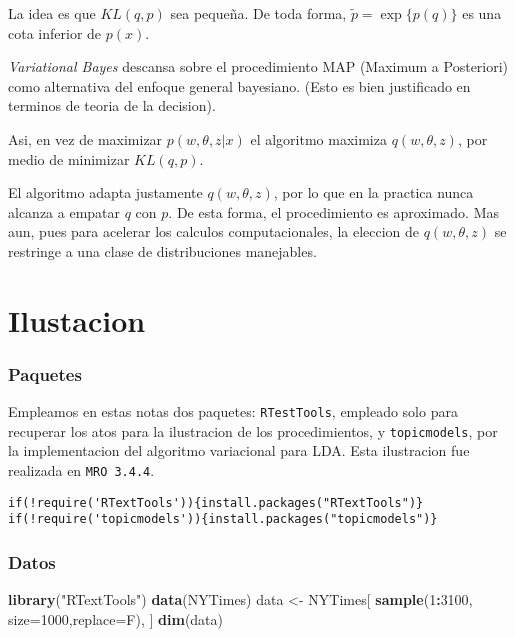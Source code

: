 \documentclass[11pt,]{article}
\newenvironment{Shaded}{\begin{snugshade}}{\end{snugshade}}
\newcommand{\KeywordTok}[1]{\textcolor[rgb]{0.13,0.29,0.53}{\textbf{#1}}}
\newcommand{\DataTypeTok}[1]{\textcolor[rgb]{0.13,0.29,0.53}{#1}}
\newcommand{\DecValTok}[1]{\textcolor[rgb]{0.00,0.00,0.81}{#1}}
\newcommand{\StringTok}[1]{\textcolor[rgb]{0.31,0.60,0.02}{#1}}
\newcommand{\OperatorTok}[1]{\textcolor[rgb]{0.81,0.36,0.00}{\textbf{#1}}}
\newcommand{\NormalTok}[1]{#1}
\begin{document}
La idea es que \(KL(q,p)\) sea pequeña. De toda forma,
\(\tilde{p}=\exp\{p(q)\}\) es una cota inferior de \(p(x)\).

\emph{Variational Bayes} descansa sobre el procedimiento MAP (Maximum a
Posteriori) como alternativa del enfoque general bayesiano. (Esto es
bien justificado en terminos de teoria de la decision).

Asi, en vez de maximizar \(p(w,\theta,z|x)\) el algoritmo maximiza
\(q(w,\theta,z)\), por medio de minimizar \(KL(q,p)\).

El algoritmo adapta justamente \(q(w,\theta,z)\), por lo que en la
practica nunca alcanza a empatar \(q\) con \(p\). De esta forma, el
procedimiento es aproximado. Mas aun, pues para acelerar los calculos
computacionales, la eleccion de \(q(w,\theta,z)\) se restringe a una
clase de distribuciones manejables.

\section{Ilustacion}\label{ilustacion}

\subsubsection{Paquetes}\label{paquetes}

Empleamos en estas notas dos paquetes: \texttt{RTestTools}, empleado
solo para recuperar los atos para la ilustracion de los procedimientos,
y \texttt{topicmodels}, por la implementacion del algoritmo variacional
para LDA. Esta ilustracion fue realizada en \texttt{MRO\ 3.4.4}.

\begin{verbatim}
if(!require('RTextTools')){install.packages("RTextTools")}
if(!require('topicmodels')){install.packages("topicmodels")}
\end{verbatim}

\subsubsection{Datos}\label{datos}

\begin{Shaded}
\begin{Highlighting}[]
\KeywordTok{library}\NormalTok{(}\StringTok{"RTextTools"}\NormalTok{)}
\KeywordTok{data}\NormalTok{(NYTimes)}
\NormalTok{data <-}\StringTok{ }\NormalTok{NYTimes[ }\KeywordTok{sample}\NormalTok{(}\DecValTok{1}\OperatorTok{:}\DecValTok{3100}\NormalTok{, }\DataTypeTok{size=}\DecValTok{1000}\NormalTok{,}\DataTypeTok{replace=}\NormalTok{F), ]}
\KeywordTok{dim}\NormalTok{(data)}
\end{Highlighting}
\end{Shaded}
\end{document}
